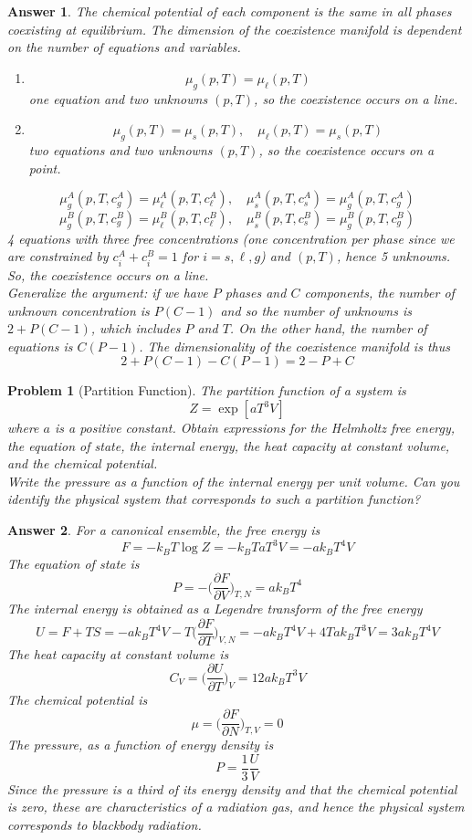 \documentclass[a4paper]{article}
\theoremstyle{new2}
\newtheorem{ans}{Answer}[section]
\theoremstyle{new}
\newtheorem{qns}{Problem}[section]
\begin{document}
\begin{ans}
The chemical potential of each component is the same in all phases coexisting at equilibrium. The dimension of the coexistence manifold is dependent on the number of equations and variables.
\begin{enumerate}[label=\roman*]
\item $$\mu_g(p,T)=\mu_\ell(p,T)$$
one equation and two unknowns $(p,T)$, so the coexistence occurs on a line.
\item $$\mu_g(p,T)=\mu_s(p,T),\quad\mu_\ell(p,T)=\mu_s(p,T)$$
two equations and two unknowns $(p,T)$, so the coexistence occurs on a point.
\end{enumerate}
$$\mu_g^A(p,T,c_g^A)=\mu_\ell^A(p,T,c_\ell^A),\quad\mu_s^A(p,T,c_s^A)=\mu_g^A(p,T,c_g^A)$$
$$\mu_g^B(p,T,c_g^B)=\mu_\ell^B(p,T,c_\ell^B),\quad\mu_s^B(p,T,c_s^B)=\mu_g^B(p,T,c_g^B)$$
4 equations with three free concentrations (one concentration per phase since we are constrained by $c_i^A+c_i^B=1$ for $i=s,\ell,g$) and $(p,T)$, hence 5 unknowns. So, the coexistence occurs on a line.\\[5pt]
Generalize the argument: if we have $P$ phases and $C$ components, the number of unknown concentration is $P(C-1)$ and so the number of unknowns is $2+P(C-1)$, which includes $P$ and $T$. On the other hand, the number of equations is $C(P-1)$. The dimensionality of the coexistence manifold is thus
$$2+P(C-1)-C(P-1)=2-P+C$$
\end{ans}
\newpage
\begin{qns}[Partition Function]
The partition function of a system is 
$$Z=\exp[aT^3V]$$
where $a$ is a positive constant. Obtain expressions for the Helmholtz free energy, the equation of state, the internal energy, the heat capacity at constant volume, and the chemical potential. \\[5pt]
Write the pressure as a function of the internal energy per unit volume. Can you identify the physical system that corresponds to such a partition function?
\end{qns}
\begin{ans}
For a canonical ensemble, the free energy is
$$F=-k_BT\log Z=-k_BTaT^3V=-ak_BT^4V$$
The equation of state is
$$P=-\bigg(\frac{\partial F}{\partial V}\bigg)_{T,N}=ak_BT^4$$
The internal energy is obtained as a Legendre transform of the free energy
$$U=F+TS=-ak_BT^4V-T\bigg(\frac{\partial F}{\partial T}\bigg)_{V,N}=-ak_BT^4V+4Tak_BT^3V=3ak_BT^4V$$
The heat capacity at constant volume is
$$C_V=\bigg(\frac{\partial U}{\partial T}\bigg)_V=12ak_BT^3V$$
The chemical potential is
$$\mu=\bigg(\frac{\partial F}{\partial N}\bigg)_{T,V}=0$$
The pressure, as a function of energy density is
$$P=\frac{1}{3}\frac{U}{V}$$
Since the pressure is a third of its energy density and that the chemical potential is zero, these are characteristics of a radiation gas, and hence the physical system corresponds to blackbody radiation.
\end{ans}
\end{document}
